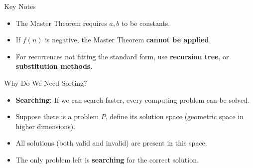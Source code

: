 \documentclass[10pt,aspectratio=43]{beamer}
\begin{document}
%
%


\begin{frame}{Key Notes}

\begin{itemize}
    \item The Master Theorem requires \( a, b \) to be constants.
    \item If \( f(n) \) is negative, the Master Theorem \textbf{cannot be applied}.
    \item For recurrences not fitting the standard form, use  \textbf{recursion tree}, or \textbf{substitution methods}.
\end{itemize}
\end{frame}



\begin{frame}{Why Do We Need Sorting?}
\begin{itemize}
    \item \textbf{Searching:} If we can search faster, every computing problem can be solved.
    \item Suppose there is a problem \( P \), define its solution space (geometric space in higher dimensions).
    \item All solutions (both valid and invalid) are present in this space.
    \item The only problem left is \textbf{searching} for the correct solution.
\end{itemize}
\end{frame}
\end{document}

